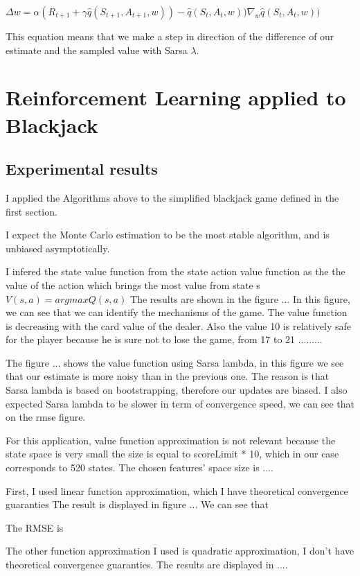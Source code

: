 \documentclass[12pt,a4paper]{article}
\begin{document}
$\Delta w=\alpha (R_{t+1} + \gamma \hat{q}(S_{t+1}, A_{t+1}, w) ) - \hat{q}(S_{t}, A_{t}, w) )\nabla_{w}\hat{q}(S_{t}, A_{t}, w) )$ 


This equation means that we make a step in direction of the difference of our estimate and the sampled value with Sarsa $\lambda$.

\section{Reinforcement Learning applied to Blackjack}

\subsection{Experimental results}


I applied the Algorithms above to the simplified blackjack game defined in the first section.

I expect the Monte Carlo estimation to be the most stable algorithm, and is unbiased asymptotically.

I infered the state value function from the state action value function as the the value of the action which brings the most  value from state s $V(s,a) = argmaxQ(s,a)$  The results are shown in the figure ... In this figure, we can see that we can identify the mechanisms of the game. The value function is decreasing with the card value of the dealer. Also the value 10 is relatively safe for the player because he is sure not to lose the game, from 17 to 21 .........

The figure ... shows the value function using Sarsa lambda, in this figure we see that our estimate is more noisy than in the previous one. The reason is that Sarsa lambda is based on bootstrapping, therefore our updates are biased. I also expected Sarsa lambda to be slower in term of convergence speed, we can see that on the rmse figure.

For this application, value function approximation is not relevant because the state space is very small the size is equal to scoreLimit * 10, which in our case corresponds to 520 states. The chosen features' space size is ....  

First, I used linear function approximation, which I have theoretical convergence guaranties The result is displayed in figure ...
We can see that 

The RMSE is 

The other function approximation I used is quadratic approximation, I don't have theoretical convergence guaranties. The results are displayed in ....
\end{document}
